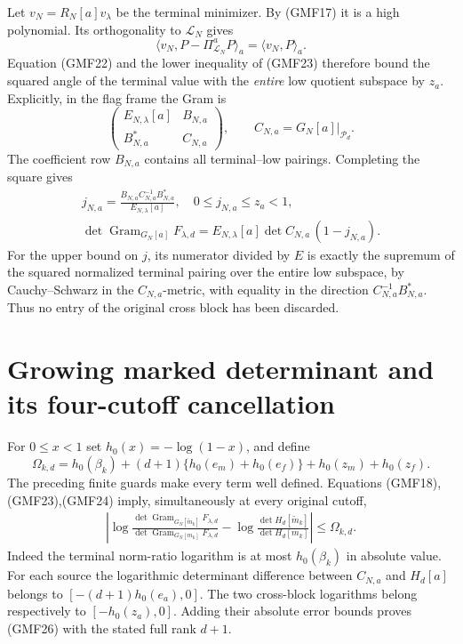 \documentclass[11pt]{article}
\newcommand{\PP}{\mathcal P}
\DeclareMathOperator{\Gram}{Gram}
\begin{document}
Let \(v_N=R_N[a]v_\lambda\) be the terminal minimizer.
By (GMF17) it is a high polynomial.  Its orthogonality to
\(\mathcal L_N\) gives
\[
 \langle v_N,P-\Pi_{\mathcal L_N}^aP\rangle_a
                       =\langle v_N,P\rangle_a.
\]
Equation (GMF22) and the lower inequality of (GMF23)
therefore bound the squared angle of the terminal value
with the \emph{entire} low quotient subspace by \(z_a\).
Explicitly, in the flag frame the Gram is
\[
 \begin{pmatrix} E_{N,\lambda}[a]&B_{N,a}\\
                 B_{N,a}^*&C_{N,a}\end{pmatrix},\qquad
 C_{N,a}=G_N[a]|_{\PP_d}.
\]
The coefficient row \(B_{N,a}\) contains all terminal--low
pairings.  Completing the square gives
\begin{equation}\tag{GMF24}
\begin{gathered}
 j_{N,a}=
 \frac{B_{N,a}C_{N,a}^{-1}B_{N,a}^*}{E_{N,\lambda}[a]},
 \quad 0\le j_{N,a}\le z_a<1,\\
 \det\Gram_{G_N[a]}F_{\lambda,d}
 =E_{N,\lambda}[a]\det C_{N,a}\,(1-j_{N,a}).
\end{gathered}
\end{equation}
For the upper bound on \(j\), its numerator divided by \(E\)
is exactly the supremum of the squared normalized terminal
pairing over the entire low subspace, by Cauchy--Schwarz
in the \(C_{N,a}\)-metric, with equality in the direction
\(C_{N,a}^{-1}B_{N,a}^*\).
Thus no entry of the original cross block has been discarded.

\section{Growing marked determinant and its four-cutoff cancellation}

For \(0\le x<1\) set \(h_0(x)=-\log(1-x)\), and define
\begin{equation}\tag{GMF25}
 \Omega_{k,d}=
 h_0(\beta_k)
 +(d+1)\{h_0(e_m)+h_0(e_f)\}
 +h_0(z_m)+h_0(z_f).
\end{equation}
The preceding finite guards make every term well defined.
Equations (GMF18),(GMF23),(GMF24) imply, simultaneously at
every original cutoff,
\begin{equation}\tag{GMF26}
\begin{split}
 \left|
 \log\frac{\det\Gram_{G_N[\widetilde m_k]}F_{\lambda,d}}
              {\det\Gram_{G_N[m_k]}F_{\lambda,d}}
 -\log\frac{\det H_d[\widetilde m_k]}{\det H_d[m_k]}
 \right|\le\Omega_{k,d}.
\end{split}
\end{equation}
Indeed the terminal norm-ratio logarithm is at most
\(h_0(\beta_k)\) in absolute value.
For each source the logarithmic determinant difference
between \(C_{N,a}\) and \(H_d[a]\) belongs to
\([-(d+1)h_0(e_a),0]\).
The two cross-block logarithms belong respectively to
\([-h_0(z_a),0]\).
Adding their absolute error bounds proves (GMF26) with
the stated full rank \(d+1\).
\end{document}
